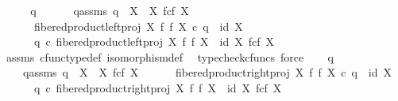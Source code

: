 \begin{isabellebody}
%
\isadelimproof
%
\endisadelimproof
%
\isatagproof
{}\isamarkupfalse%
\ {\isacharminus}{\kern0pt}\isanewline
\ \ \isamarkupfalse%
\ q{}\ \ \isanewline
\ \ \ \ q{}{\isacharunderscore}{\kern0pt}assms{\isacharcolon}{\kern0pt}\ {\isachardoublequoteopen}q{}\ {\isacharcolon}{\kern0pt}\ X\ {\isasymrightarrow}\ X\ \isactrlbsub f\isactrlesub {\isasymtimes}\isactrlsub c\isactrlbsub f\isactrlesub \ X{\isachardoublequoteclose}\isanewline
\ \ \ \ \ \ {\isachardoublequoteopen}fibered{\isacharunderscore}{\kern0pt}product{\isacharunderscore}{\kern0pt}left{\isacharunderscore}{\kern0pt}proj\ X\ f\ f\ X\ {\isasymcirc}\isactrlsub c\ q{}\ {\isacharequal}{\kern0pt}\ id\ X{\isachardoublequoteclose}\isanewline
\ \ \ \ \ \ {\isachardoublequoteopen}q{}\ {\isasymcirc}\isactrlsub c\ fibered{\isacharunderscore}{\kern0pt}product{\isacharunderscore}{\kern0pt}left{\isacharunderscore}{\kern0pt}proj\ X\ f\ f\ X\ {\isacharequal}{\kern0pt}\ id\ {\isacharparenleft}{\kern0pt}X\ \isactrlbsub f\isactrlesub {\isasymtimes}\isactrlsub c\isactrlbsub f\isactrlesub \ X{\isacharparenright}{\kern0pt}{\isachardoublequoteclose}\isanewline
\ \ \ \ \isamarkupfalse%
\ assms{\isacharparenleft}{\kern0pt}{}{\isacharcomma}{\kern0pt}{}{\isacharparenright}{\kern0pt}\ cfunc{\isacharunderscore}{\kern0pt}type{\isacharunderscore}{\kern0pt}def\ isomorphism{\isacharunderscore}{\kern0pt}def\ \isamarkupfalse%
\ {\isacharparenleft}{\kern0pt}typecheck{\isacharunderscore}{\kern0pt}cfuncs{\isacharcomma}{\kern0pt}\ force{\isacharparenright}{\kern0pt}\isanewline
\isanewline
\ \ \isamarkupfalse%
\ q{}\ \ \isanewline
\ \ \ \ q{}{\isacharunderscore}{\kern0pt}assms{\isacharcolon}{\kern0pt}\ {\isachardoublequoteopen}q{}\ {\isacharcolon}{\kern0pt}\ X\ {\isasymrightarrow}\ X\ \isactrlbsub f\isactrlesub {\isasymtimes}\isactrlsub c\isactrlbsub f\isactrlesub \ X{\isachardoublequoteclose}\isanewline
\ \ \ \ \ \ {\isachardoublequoteopen}fibered{\isacharunderscore}{\kern0pt}product{\isacharunderscore}{\kern0pt}right{\isacharunderscore}{\kern0pt}proj\ X\ f\ f\ X\ {\isasymcirc}\isactrlsub c\ q{}\ {\isacharequal}{\kern0pt}\ id\ X{\isachardoublequoteclose}\isanewline
\ \ \ \ \ \ {\isachardoublequoteopen}q{}\ {\isasymcirc}\isactrlsub c\ fibered{\isacharunderscore}{\kern0pt}product{\isacharunderscore}{\kern0pt}right{\isacharunderscore}{\kern0pt}proj\ X\ f\ f\ X\ {\isacharequal}{\kern0pt}\ id\ {\isacharparenleft}{\kern0pt}X\ \isactrlbsub f\isactrlesub {\isasymtimes}\isactrlsub c\isactrlbsub f\isactrlesub \ X{\isacharparenright}{\kern0pt}{\isachardoublequoteclose}\isanewline

\end{isabellebody}
